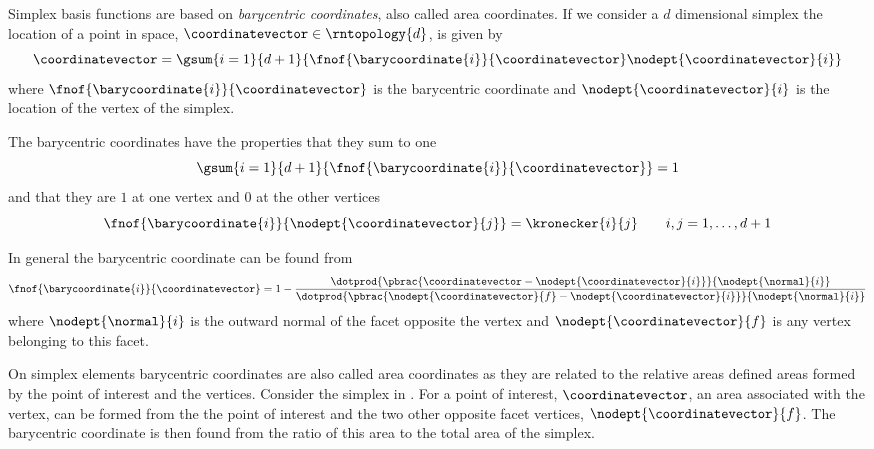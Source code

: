 Simplex basis functions are based on \emph{barycentric coordinates},
also called area coordinates. If we consider a $d$ dimensional simplex
the location of a point in space, $\coordinatevector\in\rntopology{d}$, is
given by
\begin{equation}
 \coordinatevector=\gsum{i=1}{d+1}{\fnof{\barycoordinate{i}}{\coordinatevector}\nodept{\coordinatevector}{i}}
\end{equation}
where $\fnof{\barycoordinate{i}}{\coordinatevector}$ is the 
barycentric coordinate and $\nodept{\coordinatevector}{i}$ is the location of
the  vertex of the simplex.

The barycentric coordinates have the properties that they sum to one \ie
\begin{equation}
  \gsum{i=1}{d+1}{\fnof{\barycoordinate{i}}{\coordinatevector}}=1
\end{equation}
and that they are $1$ at one vertex and $0$ at the other vertices \ie
\begin{equation}
\fnof{\barycoordinate{i}}{\nodept{\coordinatevector}{j}}=\kronecker{i}{j}\qquad i,j=1,\ldots,d+1
\end{equation}

In general the  barycentric coordinate can be found from
\begin{equation}
  \fnof{\barycoordinate{i}}{\coordinatevector}=1-
  \dfrac{
    \dotprod{\pbrac{\coordinatevector-\nodept{\coordinatevector}{i}}}{\nodept{\normal}{i}}
  }{ 
    \dotprod{\pbrac{\nodept{\coordinatevector}{f}-\nodept{\coordinatevector}{i}}}{\nodept{\normal}{i}}
  }
\end{equation}
where $\nodept{\normal}{i}$ is the outward normal of the facet
opposite the  vertex and $\nodept{\coordinatevector}{f}$ is any
vertex belonging to this facet.

On simplex elements barycentric coordinates are also called area
coordinates as they are related to the relative areas defined areas
formed by the point of interest and the vertices. Consider the \twodal
simplex in . For a point of interest,
$\coordinatevector$, an area associated with the  vertex, can be
formed from the the point of interest and the two other opposite facet
vertices, $\nodept{\coordinatevector}{f}$. The  barycentric
coordinate is then found from the ratio of this area to the total area
of the simplex.


